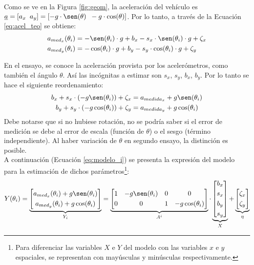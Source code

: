 

	Como se ve en la Figura \ref{fig:geom}, la aceleración del vehículo es $\underline{a}=[a_x \;\; a_y] = [-g\cdot \sen(\theta) \;\; -g\cdot \cos(\theta)]$. Por lo tanto, a través de la Ecuación \eqref{eq:acel_teo} se obtiene:
	\begin{align*}
		a_{med_x}(\theta_i) &= - \sen(\theta_i) \cdot g + b_x - s_x\cdot \sen(\theta_i)\cdot g + \zeta_x  \\
		a_{med_y}(\theta_i) &= - \cos(\theta_i) \cdot g + b_y - s_y\cdot \cos(\theta_i)\cdot g + \zeta_y 
	\end{align*}

	En el ensayo, se conoce la aceleración provista por los acelerómetros, como también el ángulo $\theta$. Así las incógnitas a estimar son $s_x$, $s_y$, $b_x$, $b_y$. Por lo tanto se hace el siguiente reordenamiento:
	\begin{align*}
		b_x  + s_x \cdot (-g\sen(\theta_i)) + \zeta_x &= a_{medida_x} + g\sen(\theta_i)\\
		b_y  + s_y \cdot (-g\cos(\theta_i)) + \zeta_y &= a_{medida_y} + g\cos(\theta_i)
	\end{align*}
	Debe notarse que si no hubiese rotación, no se podría saber si el error de medición se debe al error de escala (función de $\theta$) o el sesgo (término independiente). Al haber variación de $\theta$ en segundo ensayo, la distinción es posible. \\
	\indent A continuación (Ecuación \eqref{eq:modelo_i}) se presenta la expresión del modelo para la estimación de dichos parámetros\footnote{Para diferenciar las variables $X$ e $Y$ del modelo con las variables $x$ e $y$ espaciales, se representan con mayúsculas y minúsculas respectivamente.}:
	\begin{equation}
		Y(\theta_i) = \underbrace{\begin{bmatrix} a_{med_x}(\theta_i) +g\sen(\theta_i) \\[0.3em] a_{med_y}(\theta_i)+g\cos(\theta_i) \end{bmatrix}}_{Y_i} = \underbrace{\begin{bmatrix} 1 & -g\sen(\theta_i) & 0 & 0 \\[0.3em] 0&0& 1& -g\cos(\theta_i) \end{bmatrix}}_{A^i} \cdot \underbrace{\begin{bmatrix} b_x\\[0.3em] s_x\\[0.3em] b_y\\[0.3em] s_y \end{bmatrix}}_{X} + \underbrace{\begin{bmatrix} \zeta_x \\[0.3em] \zeta_y \end{bmatrix}}_{\eta}
		\label{eq:modelo_i}
	\end{equation}

